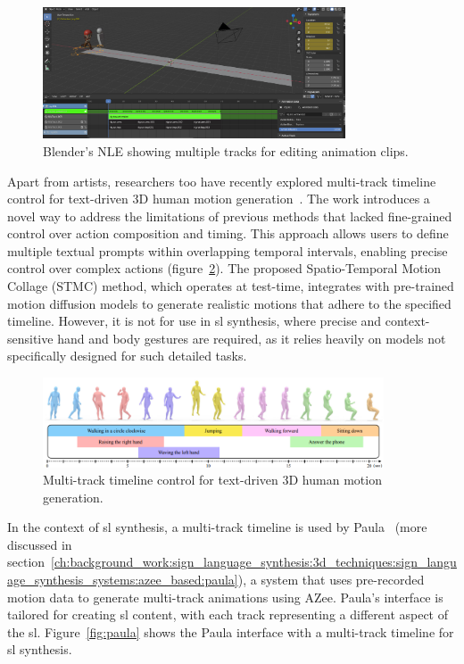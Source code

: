 \documentclass[../../main.tex]{subfiles}
\begin{document}
\begin{figure}
    \centering
    \includegraphics[width=0.8\textwidth]{chapters/background_work/images/nle_blender.png}
    \caption{Blender's NLE showing multiple tracks for editing animation clips.}
    \label{fig:nle_editor}
\end{figure}

Apart from artists, researchers too have recently explored multi-track timeline control for text-driven 3D human motion generation~\cite{petrovich24stmc}. The work introduces a novel way to address the limitations of previous methods that lacked fine-grained control over action composition and timing. This approach allows users to define multiple textual prompts within overlapping temporal intervals, enabling precise control over complex actions (figure~\ref{fig:multi_track_other}). The proposed Spatio-Temporal Motion Collage (STMC) method, which operates at test-time, integrates with pre-trained motion diffusion models to generate realistic motions that adhere to the specified timeline. However, it is not for use in \gls{sl} synthesis, where precise and context-sensitive hand and body gestures are required, as it relies heavily on models not specifically designed for such detailed tasks.

\begin{figure}
    \centering
    \includegraphics[width=0.9\textwidth]{chapters/background_work/images/multi_track_other.png}
    \caption{Multi-track timeline control for text-driven 3D human motion generation.}
    \label{fig:multi_track_other}
\end{figure}

In the context of \gls{sl} synthesis, a multi-track timeline is used by Paula~\cite{filhol2017synthesizing} (more discussed in section~\ref{ch:background_work:sign_language_synthesis:3d_techniques:sign_language_synthesis_systems:azee_based:paula}), a system that uses pre-recorded motion data to generate multi-track animations using AZee. Paula's interface is tailored for creating \gls{sl} content, with each track representing a different aspect of the \gls{sl}. Figure~\ref{fig:paula} shows the Paula interface with a multi-track timeline for \gls{sl} synthesis.
\end{document}
